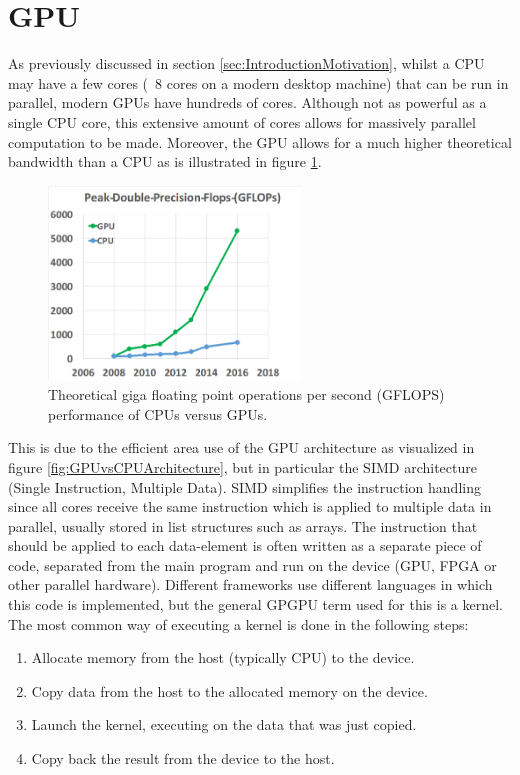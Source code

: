 \section{GPU} \label{sec:GPUTheory}
As previously discussed in section \ref{sec:IntroductionMotivation}, whilst a CPU may have a few cores (~8 cores on a modern desktop machine) that can be run in parallel, modern GPUs have hundreds of cores. Although not as powerful as a single CPU core, this extensive amount of cores allows for massively parallel computation to be made. Moreover, the GPU allows for a much higher theoretical bandwidth than a CPU as is illustrated in figure \ref{fig:GPUGFLOPS}.

\begin{figure}[!htpb]
    \centering
    \includegraphics[width=0.6\textwidth]{Theory/Figs/GFLOPSGPU.png}
    \caption{Theoretical giga floating point operations per second (GFLOPS) performance of CPUs versus GPUs. \cite{Ingemar9b}}
    \label{fig:GPUGFLOPS}
\end{figure}

\noindent This is due to the efficient area use of the GPU architecture as visualized in figure \ref{fig:GPUvsCPUArchitecture}, but in particular the SIMD architecture (Single Instruction, Multiple Data). SIMD simplifies the instruction handling since all cores receive the same instruction which is applied to multiple data in parallel, usually stored in list structures such as arrays. The instruction that should be applied to each data-element is often written as a separate piece of code, separated from the main program and run on the device (GPU, FPGA or other parallel hardware). Different frameworks use different languages in which this code is implemented, but the general GPGPU term used for this is a kernel. The most common way of executing a kernel is done in the following steps:
\begin{enumerate}
    \item Allocate memory from the host (typically CPU) to the device.
    \item Copy data from the host to the allocated memory on the device.
    \item Launch the kernel, executing on the data that was just copied.
    \item Copy back the result from the device to the host.
\end{enumerate}

